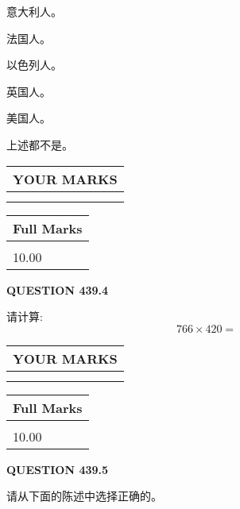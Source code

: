 \documentclass{ctexart}
\begin{document}
  
 
 
意大利人。
 
 
法国人。
 
 
以色列人。
 
 
英国人。
 
 
美国人。
 
 
 上述都不是。
 
 
  
\vspace{0.2in}
  
\noindent\begin{tabular}{|l|}
\hline
 YOUR MARKS  \\
\hline
 \\ 
 \\ 
\hline
\end{tabular}
\hspace{0.05in} \begin{tabular}{|l|}
\hline
 Full Marks  \\
\hline
 \\ 
10.00 \\
\hline
\end{tabular}
{\textbf{\Large{QUESTION
439.4 
}}}
  
  
 
请计算:
\begin{equation}
766  \times    %
420 = \nonumber
\end{equation}
 

 

 
  
\vspace{0.2in}
  
\noindent\begin{tabular}{|l|}
\hline
 YOUR MARKS  \\
\hline
 \\ 
 \\ 
\hline
\end{tabular}
\hspace{0.05in} \begin{tabular}{|l|}
\hline
 Full Marks  \\
\hline
 \\ 
10.00 \\
\hline
\end{tabular}
{\textbf{\Large{QUESTION
439.5 
}}}
  
  
请从下面的陈述中选择正确的。
  
\end{document}
